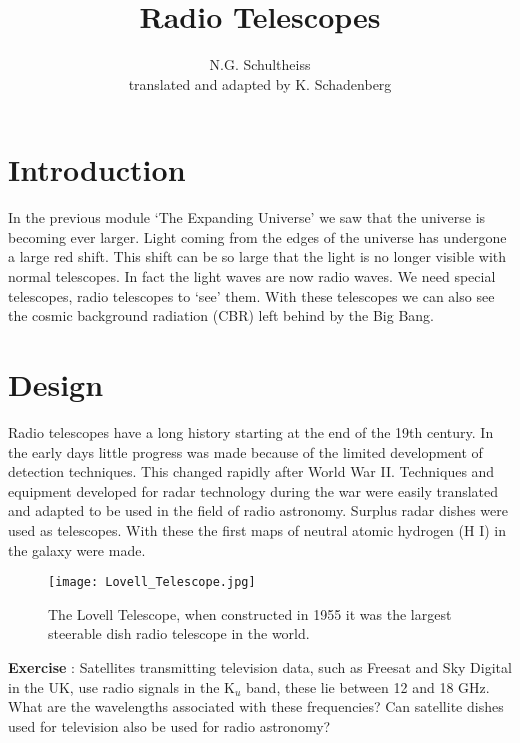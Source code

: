 


\author{N.G. Schultheiss \\ translated and adapted by K. Schadenberg}
\date{}
\title{Radio Telescopes}



\maketitle

\section{Introduction}
In the previous module `The Expanding Universe' we saw that the universe is becoming ever larger. Light coming from the edges of the universe has undergone a large red shift. This shift can be so large that the light is no longer visible with normal telescopes. In fact the light waves are now radio waves. We need special telescopes, radio telescopes to `see' them. With these telescopes we can also see the cosmic background radiation (CBR) left behind by the Big Bang. 

\section{Design}
Radio telescopes have a long history starting at the end of the 19th century. In the early days little progress was made because of the limited development of detection techniques. This changed rapidly after World War II. Techniques and equipment developed for radar technology during the war were easily translated and adapted to be used in the field of radio astronomy. Surplus radar dishes were used as telescopes. With these the first maps of neutral atomic hydrogen (H I) in the galaxy were made.

\begin{figure}\begin{center}
\texttt{[image: Lovell\_Telescope.jpg]}%
\caption{The Lovell Telescope, when constructed in 1955 it was the largest steerable dish radio telescope in the world.}
\end{center}\end{figure}

\begin{shaded}
\textbf{Exercise \theExercise {}} : Satellites transmitting television data, such as Freesat and Sky Digital in the UK, use radio signals in the K$_u$ band, these lie between 12 and 18 GHz. What are the wavelengths associated with these frequencies? Can satellite dishes used for television also be used for radio astronomy?\end{shaded}

